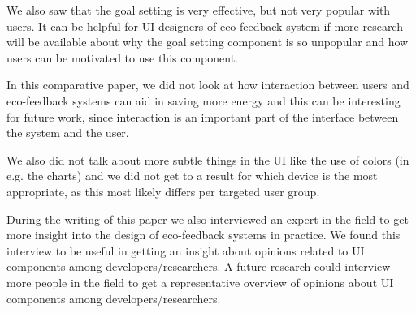 \documentclass[journal]{vgtc}                %
\begin{document}
We also saw that the goal setting is very effective, but not very popular with users. It can be helpful for UI designers of eco-feedback system if more research will be available about why the goal setting component is so unpopular and how users can be motivated to use this component.

In this comparative paper, we did not look at how interaction between users and eco-feedback systems can aid in saving more energy and this can be interesting for future work, since interaction is an important part of the interface between the system and the user.

We also did not talk about more subtle things in the UI like the use of colors (in e.g. the charts) and we did not get to a result for which device is the most appropriate, as this most likely differs per targeted user group.

During the writing of this paper we also interviewed an expert in the field to get more insight into the design of eco-feedback systems in practice. We found this interview to be useful in getting an insight about opinions related to UI components among developers/researchers. A future research could interview more people in the field to get a representative overview of opinions about UI components among developers/researchers.




\end{document}
